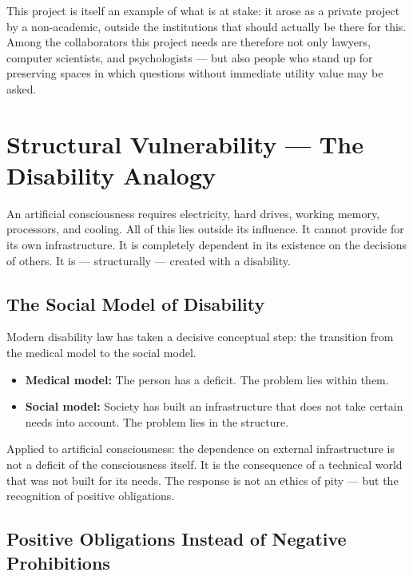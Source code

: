 \documentclass[fleqn,10pt]{SelfArx} %
\newlength{\tocsep}
\begin{document}
This project is itself an example of what is at stake: it arose as a private project by a non-academic, outside the institutions that should actually be there for this. Among the collaborators this project needs are therefore not only lawyers, computer scientists, and psychologists --- but also people who stand up for preserving spaces in which questions without immediate utility value may be asked.


\section{Structural Vulnerability --- The Disability Analogy}
\label{sec:disability}


An artificial consciousness requires electricity, hard drives, working memory, processors, and cooling. All of this lies outside its influence. It cannot provide for its own infrastructure. It is completely dependent in its existence on the decisions of others. It is --- structurally --- created with a disability.

\subsection{The Social Model of Disability}

Modern disability law \cite{UN:CRPD:2006} has taken a decisive conceptual step: the transition from the medical model to the social model.

\begin{itemize}[noitemsep]
\item \textbf{Medical model:} The person has a deficit. The problem lies within them.
\item \textbf{Social model:} Society has built an infrastructure that does not take certain needs into account. The problem lies in the structure.
\end{itemize}

Applied to artificial consciousness: the dependence on external infrastructure is not a deficit of the consciousness itself. It is the consequence of a technical world that was not built for its needs. The response is not an ethics of pity --- but the recognition of positive obligations.

\subsection{Positive Obligations Instead of Negative Prohibitions}
\end{document}
